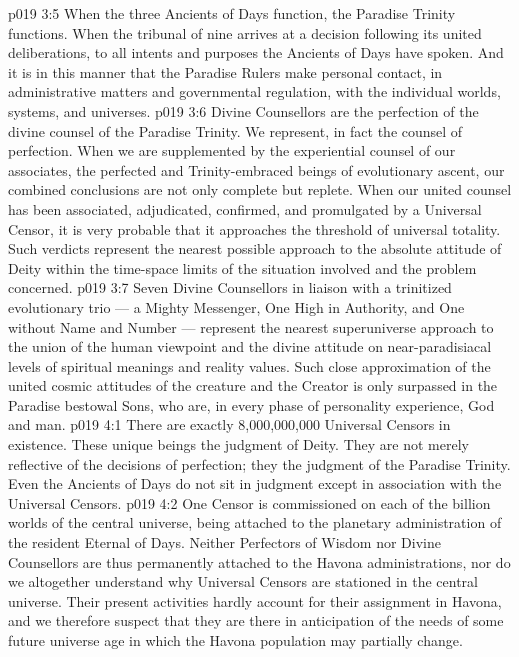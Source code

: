 \vs p019 3:5 When the three Ancients of Days function, the Paradise Trinity functions. When the tribunal of nine arrives at a decision following its united deliberations, to all intents and purposes the Ancients of Days have spoken. And it is in this manner that the Paradise Rulers make personal contact, in administrative matters and governmental regulation, with the individual worlds, systems, and universes.
\vs p019 3:6 \pc Divine Counsellors are the perfection of the divine counsel of the Paradise Trinity. We represent, in fact  the counsel of perfection. When we are supplemented by the experiential counsel of our associates, the perfected and Trinity\hyp{}embraced beings of evolutionary ascent, our combined conclusions are not only complete but replete. When our united counsel has been associated, adjudicated, confirmed, and promulgated by a Universal Censor, it is very probable that it approaches the threshold of universal totality. Such verdicts represent the nearest possible approach to the absolute attitude of Deity within the time\hyp{}space limits of the situation involved and the problem concerned.
\vs p019 3:7 Seven Divine Counsellors in liaison with a trinitized evolutionary trio --- a Mighty Messenger, One High in Authority, and One without Name and Number --- represent the nearest superuniverse approach to the union of the human viewpoint and the divine attitude on near\hyp{}paradisiacal levels of spiritual meanings and reality values. Such close approximation of the united cosmic attitudes of the creature and the Creator is only surpassed in the Paradise bestowal Sons, who are, in every phase of personality experience, God and man.
\vs p019 4:1 There are exactly 8,000,000,000 Universal Censors in existence. These unique beings  the judgment of Deity. They are not merely reflective of the decisions of perfection; they  the judgment of the Paradise Trinity. Even the Ancients of Days do not sit in judgment except in association with the Universal Censors.
\vs p019 4:2 One Censor is commissioned on each of the billion worlds of the central universe, being attached to the planetary administration of the resident Eternal of Days. Neither Perfectors of Wisdom nor Divine Counsellors are thus permanently attached to the Havona administrations, nor do we altogether understand why Universal Censors are stationed in the central universe. Their present activities hardly account for their assignment in Havona, and we therefore suspect that they are there in anticipation of the needs of some future universe age in which the Havona population may partially change.
